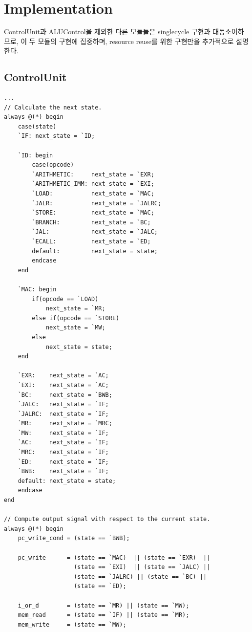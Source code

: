 \documentclass[openright, a4paper]{article}
\newenvironment{longlisting}{\captionsetup{type=listing}}{}
\begin{document}
\section{Implementation}
ControlUnit과 ALUControl을 제외한 다른 모듈들은 singlecycle 구현과
대동소이하므로, 이 두 모듈의 구현에 집중하며, resource reuse를 위한 구현만을 추가적으로 설명한다.

\subsection{ControlUnit}
\begin{longlisting}
    \begin{verbatim}
...
// Calculate the next state.
always @(*) begin
    case(state)
    `IF: next_state = `ID;

    `ID: begin
        case(opcode)
        `ARITHMETIC:     next_state = `EXR;
        `ARITHMETIC_IMM: next_state = `EXI;
        `LOAD:           next_state = `MAC;
        `JALR:           next_state = `JALRC;
        `STORE:          next_state = `MAC;
        `BRANCH:         next_state = `BC;
        `JAL:            next_state = `JALC;
        `ECALL:          next_state = `ED;
        default:         next_state = state;
        endcase
    end

    `MAC: begin
        if(opcode == `LOAD)
            next_state = `MR;
        else if(opcode == `STORE)
            next_state = `MW;
        else
            next_state = state;
    end

    `EXR:    next_state = `AC;
    `EXI:    next_state = `AC;
    `BC:     next_state = `BWB;
    `JALC:   next_state = `IF;
    `JALRC:  next_state = `IF;
    `MR:     next_state = `MRC;
    `MW:     next_state = `IF;
    `AC:     next_state = `IF;
    `MRC:    next_state = `IF;
    `ED:     next_state = `IF;
    `BWB:    next_state = `IF;
    default: next_state = state;
    endcase
end

// Compute output signal with respect to the current state.
always @(*) begin
    pc_write_cond = (state == `BWB);

    pc_write      = (state == `MAC)  || (state == `EXR)  || 
                    (state == `EXI)  || (state == `JALC) || 
                    (state == `JALRC) || (state == `BC) ||
                    (state == `ED);

    i_or_d        = (state == `MR) || (state == `MW);
    mem_read      = (state == `IF) || (state == `MR);
    mem_write     = (state == `MW);


\end{verbatim}
\end{longlisting}
\end{document}

